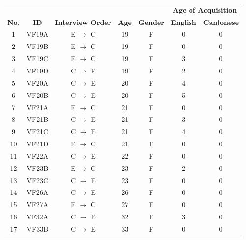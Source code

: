 \begin{table}[!htbp]
\begin{center}
\begin{tabular}{ccccccc}
\toprule
  & & & &                & \multicolumn{2}{c}{\textbf{Age of Acquisition}} \\
\textbf{No.} & \textbf{ID} & \textbf{Interview Order} & \textbf{Age} & \textbf{Gender} & \textbf{English} & \textbf{Cantonese} \\
\midrule
1 & VF19A & E $\rightarrow$ C & 19  & F & 0   & 0 \\
2 & VF19B & E $\rightarrow$ C & 19  & F & 0   & 0 \\
3 & VF19C & E $\rightarrow$ C & 19  & F & 3   & 0 \\
4 & VF19D & C $\rightarrow$ E & 19  & F & 2   & 0 \\
5 & VF20A & C $\rightarrow$ E & 20  & F & 4   & 0 \\
6 & VF20B & C $\rightarrow$ E & 20  & F & 5   & 0 \\
7 & VF21A & E $\rightarrow$ C & 21  & F & 0   & 0 \\
8 & VF21B & C $\rightarrow$ E & 21  & F & 3   & 0 \\
9 & VF21C & C $\rightarrow$ E & 21  & F & 4   & 0 \\
10  & VF21D & E $\rightarrow$ C & 21  & F & 0   & 0 \\
11  & VF22A & C $\rightarrow$ E & 22  & F & 0   & 0 \\
12  & VF23B & E $\rightarrow$ C & 23  & F & 2   & 0 \\
13  & VF23C & C $\rightarrow$ E & 23  & F & 0   & 0 \\
14  & VF26A & C $\rightarrow$ E & 26  & F & 0   & 0 \\
15  & VF27A & E $\rightarrow$ C & 27  & F & 0   & 0 \\
16  & VF32A & C $\rightarrow$ E & 32  & F & 3   & 0 \\
17  & VF33B & C $\rightarrow$ E & 33  & F & 0   & 0 \\

\end{tabular}
\end{center}
\end{table}
